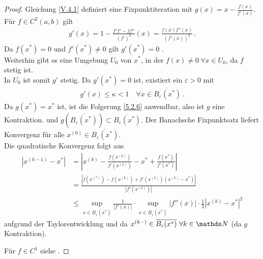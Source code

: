\begin{proof}
  Gleichung \eqref{V.4.1} definiert eine Fixpunktiteration mit $g(x) = x-\frac{f(x)}{f'(x)}$.\\
  Für $f\in C^2(a,b)$ gilt 
  \begin{gather*}
    g'(x) = 1- \frac{f'f'-ff''}{(f')^2}(x)= \frac{f(x)f''(x)}{(f'(x))^2}\, .
  \end{gather*}
  Da $f(x^{*})= 0$ und $f'(x^{*})\neq 0$ gilt $g'(x^{*})=0$ .\\
  Weiterhin gibt es eine Umgebung $U_0$ von $x^{*}$, in der $f(x)\neq 0~\forall x\in U_0$,
  da $f$ stetig ist.\\
  In $U_0$ ist somit $g' $ stetig. Da $g'(x^{*})=0$ ist, existiert ein $\varepsilon>0$ mit
  \begin{gather*}
    g'(x)\leq \kappa<1 \quad \forall x\in \overline{B_\varepsilon(x^{*})}\, .
  \end{gather*}
  Da $g(x^{*})=x^{*}$ ist, ist die Folgerung \ref{5.2.6} anwendbar,
  also ist $g$ eine Kontraktion. und $g(\overline{B_\varepsilon(x^{*})}) \subset \overline{B_\varepsilon(x^{*})}$.
  Der Banachsche Fixpunktsatz liefert Konvergenz für alle $x^{(0)}\in\overline{B_\varepsilon(x^{*})}$. \\
  
  Die quadratische Konvergenz folgt aus 
  \begin{align*}
    \left|x^{(k-1)}-x^{*}\right| &= \left| 
                                   x^{(k)}
                                   -\frac{f\left(x^{(k)}\right)}{f'\left(x^{(k)}\right)}
                                   -x^{*}
                                   +\frac{f\left(x^{*}\right)}{f'\left(x^{*}\right)}
                                   \right| \\
                                 &= \frac{\left| 
                                   f\left(x^{(*)}\right)
                                   -f\left(x^{(k)}\right)
                                   +f'\left(x^{(k)}\right)\left(x^{(k)}-x^{*}\right)
                                   \right|}
                                   {\left|f'\left(x^{(k)}\right)\right|}\\
                                 &\leq
                                   \sup_{x\in\overline{B_\varepsilon\left(x^{*}\right)}}
                                   \frac{1}{\left|f'\left(x\right)\right|}
                                   \cdot
                                   \sup_{x\in\overline{B_\varepsilon(x^{*})}}
                                   \left|f''(x)\right|\cdot\frac{1}{2}\left|x^{(k)}-x^{*}\right|^2
  \end{align*}
  aufgrund der Taylorentwicklung und da
  $x^{(k-)}\in\overline{B_\varepsilon(x^{*})}~\forall k\in\N$ (da $g$ Kontraktion).
  
  Für $f\in C^1$ siehe \cite{haemmerlinhoffmann}.
\end{proof}


